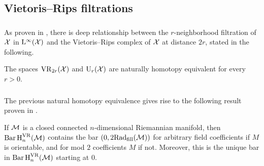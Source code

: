 

%


\subsection{Vietoris--Rips filtrations}

\subsubsection{}\label{ss:kuratowski_vr}

As proven in \cite[Thm.~4.1]{lim2024vietoris}, there is deep relationship between the \(r\)-neighborhood filtration of $\mathcal{X}$ in $\mathrm{L}^\infty(\mathcal{X})$ and the Vietoris--Rips complex of \(\mathcal{X}\) at distance \(2r\), stated in the following.

\medskip\lemma The spaces $\mathrm{VR}_{2r}(\mathcal{X})$ and $\mathrm{U}_r(\mathcal{X})$ are naturally homotopy equivalent for every \(r > 0\).

\subsubsection{}

The previous natural homotopy equivalence gives rise to the following result proven in \cite[Prop.~9.28]{lim2024vietoris}.

\medskip\lemma
If $\mathcal{M}$ is a closed connected $n$-dimensional Riemannian manifold, then \(\operatorname{Bar} \operatorname{H}_{n}^{\mathrm{VR}} (\mathcal{M})\) contains the bar \((0,2\mathrm{Rad}_{\mathrm{fill}}(\mathcal{M}))\) for arbitrary field coefficients if $M$ is orientable, and for mod $2$ coefficients $M$ if not.
Moreover, this is the unique bar in \(\operatorname{Bar} \operatorname{H}_{n}^{\mathrm{VR}} (\mathcal{M})\) starting at $0$.


